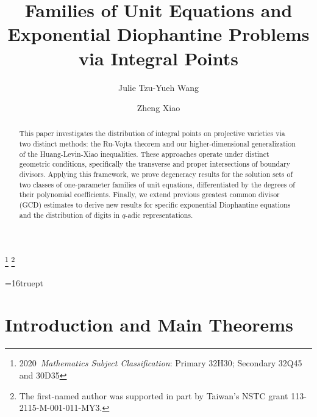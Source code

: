 \documentclass[10pt]{amsart}
\numberwithin{equation}{section}
\theoremstyle{plain}
\theoremstyle{definition}
\begin{document}
 
\title[Families of Unit Equations and Exponential Diophantine Problems]{Families of Unit Equations and Exponential Diophantine Problems via Integral Points}
 
\author{Julie Tzu-Yueh Wang}
\address{Institute of Mathematics, Academia Sinica \newline
\indent No.\ 1, Sec.\ 4, Roosevelt Road\newline
\indent Taipei 10617, Taiwan}

\author{Zheng Xiao}
\address{Department of Mathematics, University of Colorado Boulder
  \newline
{} Colorado Avenue \newline
\indent  Boulder, CO 80309 USA} 

\thanks{2020\ {\it Mathematics Subject Classification}: Primary 32H30; Secondary 32Q45 and 30D35}
\thanks{The  first-named author was supported in part by Taiwan's NSTC grant  113-2115-M-001-011-MY3.}


\begin{abstract} 
This paper investigates the distribution of integral points on projective varieties via two distinct methods: the Ru-Vojta theorem and our higher-dimensional generalization of the Huang-Levin-Xiao inequalities. These approaches operate under distinct geometric conditions, specifically the transverse and proper intersections of boundary divisors.  Applying this framework, we prove  degeneracy results for the solution sets of two classes of one-parameter families of unit equations, differentiated by the degrees of their polynomial coefficients.
Finally, we extend previous greatest common divisor (GCD) estimates to derive new results for specific exponential Diophantine equations and   the distribution of digits in  $q$-adic representations.
 \end{abstract}

\maketitle
 \baselineskip=16truept

 \section{Introduction and Main Theorems}\label{sec:intro}
\end{document}
